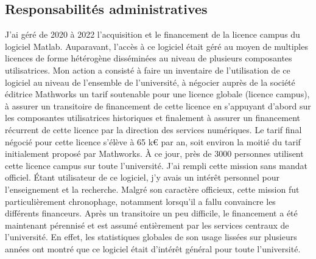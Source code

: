 \documentclass[a4paper,12pt]{article}
\begin{document}


\subsection{Responsabilités administratives}

J’ai géré de 2020 à 2022 l’acquisition et le financement de la licence campus du logiciel Matlab. Auparavant, l’accès à ce logiciel était géré au moyen de multiples licences de forme hétérogène disséminées au niveau de plusieurs composantes utilisatrices. Mon action a consisté à faire un inventaire de l’utilisation de ce logiciel au niveau de l’ensemble de l’université, à négocier auprès de la société éditrice Mathworks un tarif soutenable pour une licence globale (licence campus), à assurer un transitoire de financement de cette licence en s’appuyant d’abord sur les composantes utilisatrices historiques et finalement à assurer un financement récurrent de cette licence par la direction des services numériques. Le tarif final négocié pour cette licence s'élève à 65 k€ par an, soit environ la moitié du tarif initialement proposé par Mathworks. À ce jour, près de 3000 personnes utilisent cette licence campus sur toute l’université. J’ai rempli cette mission sans mandat officiel. Étant utilisateur de ce logiciel, j’y avais un intérêt personnel pour l’enseignement et la recherche. Malgré son caractère officieux, cette mission fut particulièrement chronophage, notamment lorsqu’il a fallu convaincre les différents financeurs. Après un transitoire un peu difficile, le financement a été maintenant pérennisé et est assumé entièrement par les services centraux de l'université. En effet, les statistiques globales de son usage lissées sur plusieurs années ont montré que ce logiciel était d'intérêt général pour toute l'université.
\end{document}
